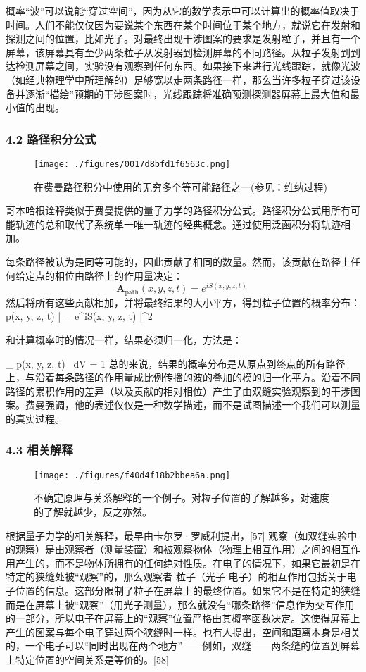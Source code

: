 概率“波”可以说能“穿过空间”，因为从它的数学表示中可以计算出的概率值取决于时间。人们不能仅仅因为要说某个东西在某个时间位于某个地方，就说它在发射和探测之间的位置，比如光子。对最终出现干涉图案的要求是发射粒子，并且有一个屏幕，该屏幕具有至少两条粒子从发射器到检测屏幕的不同路径。从粒子发射到到达检测屏幕之间，实验没有观察到任何东西。如果接下来进行光线跟踪，就像光波（如经典物理学中所理解的）足够宽以走两条路径一样，那么当许多粒子穿过该设备并逐渐“描绘”预期的干涉图案时，光线跟踪将准确预测探测器屏幕上最大值和最小值的出现。
\subsubsection{4.2 路径积分公式}
\begin{figure}[ht]
\centering
\texttt{[image: ./figures/0017d8bfd1f6563c.png]}
\caption{在费曼路径积分中使用的无穷多个等可能路径之一(参见：维纳过程)} \label{fig_SFSY_8}
\end{figure}
哥本哈根诠释类似于费曼提供的量子力学的路径积分公式。路径积分公式用所有可能轨迹的总和取代了系统单一唯一轨迹的经典概念。通过使用泛函积分将轨迹相加。

每条路径被认为是同等可能的，因此贡献了相同的数量。然而，该贡献在路径上任何给定点的相位由路径上的作用量决定：
$$\mathbf{A}_{\text{path}}(x, y, z, t) = e^{i S(x, y, z, t)}~$$
然后将所有这些贡献相加，并将最终结果的大小平方，得到粒子位置的概率分布：
p(x, y, z, t) \propto \left| \int_{} e^{iS(x, y, z, t)} \right|^2

和计算概率时的情况一样，结果必须归一化，方法是：

\iiint_{} p(x, y, z, t) \, dV = 1
总的来说，结果的概率分布是从原点到终点的所有路径上，与沿着每条路径的作用量成比例传播的波的叠加的模的归一化平方。沿着不同路径的累积作用的差异（以及贡献的相对相位）产生了由双缝实验观察到的干涉图案。费曼强调，他的表述仅仅是一种数学描述，而不是试图描述一个我们可以测量的真实过程。
\subsubsection{4.3 相关解释}
\begin{figure}[ht]
\centering
\texttt{[image: ./figures/f40d4f18b2bbea6a.png]}
\caption{不确定原理与关系解释的一个例子。对粒子位置的了解越多，对速度的了解就越少，反之亦然。} \label{fig_SFSY_9}
\end{figure}
根据量子力学的相关解释，最早由卡尔罗·罗威利提出，[57] 观察（如双缝实验中的观察）是由观察者（测量装置）和被观察物体（物理上相互作用）之间的相互作用产生的，而不是物体所拥有的任何绝对性质。在电子的情况下，如果它最初是在特定的狭缝处被“观察”的，那么观察者-粒子（光子-电子）的相互作用包括关于电子位置的信息。这部分限制了粒子在屏幕上的最终位置。如果它不是在特定的狭缝而是在屏幕上被“观察”（用光子测量），那么就没有“哪条路径”信息作为交互作用的一部分，所以电子在屏幕上的“观察”位置严格由其概率函数决定。这使得屏幕上产生的图案与每个电子穿过两个狭缝时一样。也有人提出，空间和距离本身是相关的，一个电子可以“同时出现在两个地方”——例如，双缝——两条缝的位置到屏幕上特定位置的空间关系是等价的。[58]
